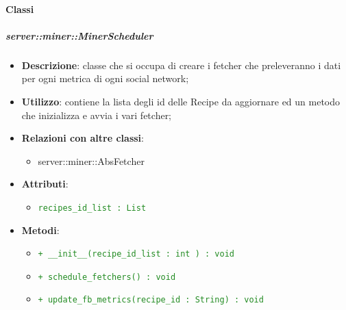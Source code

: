 \paragraph{Classi} %
		\subparagraph{server::miner::MinerScheduler} %
		\label{subp:server_miner_MinerScheduler}
			\begin{itemize}
				\item \textbf{Descrizione}: classe che si occupa di creare i fetcher che preleveranno i dati per ogni metrica di ogni social network;
				\item \textbf{Utilizzo}: contiene la lista degli id delle Recipe da aggiornare ed un metodo che inizializza e avvia i vari fetcher;
				\item \textbf{Relazioni con altre classi}:
					\begin{itemize}
						\item server::miner::AbsFetcher
					\end{itemize}
				\item \textbf{Attributi}:
					\begin{itemize}
						\item \textcolor{forestgreen}{\texttt{recipes\_id\_list : List}}
					\end{itemize}
				\item \textbf{Metodi}:   
					\begin{itemize}
						\item \textcolor{forestgreen}{\texttt{+ \_\_init\_\_(recipe\_id\_list : int ) : void}}
						\item \textcolor{forestgreen}{\texttt{+ schedule\_fetchers() : void}}
						\item \textcolor{forestgreen}{\texttt{+ update\_fb\_metrics(recipe\_id : String) : void}}

\end{itemize}
\end{itemize}
